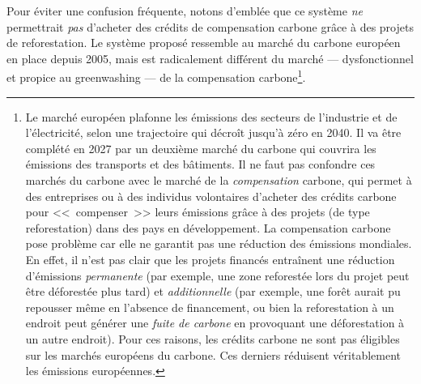 \documentclass[a5paper,french,openany]{memoir}
\begin{document}
Pour éviter une confusion fréquente, notons d'emblée que ce système \textit{ne} permettrait \textit{pas} d'acheter des crédits de compensation carbone grâce à des projets de reforestation. Le système proposé ressemble au marché du carbone européen en place depuis 2005, mais est radicalement différent du marché --- dysfonctionnel et propice au greenwashing --- de la compensation carbone\footnote{Le marché européen plafonne les émissions des secteurs de l'industrie et de l'électricité, selon une trajectoire qui décroît jusqu'à zéro en 2040. Il va être complété en 2027 par un deuxième marché du carbone qui couvrira les émissions des transports et des bâtiments. Il ne faut pas confondre ces marchés du carbone avec le marché de la \textit{compensation} carbone, qui permet à des entreprises ou à des individus volontaires d'acheter des crédits carbone pour <<~compenser~>> leurs émissions grâce à des projets (de type reforestation) dans des pays en développement. La compensation carbone pose problème car elle ne garantit pas une réduction des émissions mondiales. En effet, il n'est pas clair que les projets financés entraînent une réduction d'émissions \textit{permanente} (par exemple, une zone reforestée lors du projet peut être déforestée plus tard) et \textit{additionnelle} (par exemple, une forêt aurait pu repousser même en l'absence de financement, ou bien la reforestation à un endroit peut générer une \textit{fuite de carbone} en provoquant une déforestation à un autre endroit). Pour ces raisons, les crédits carbone ne sont pas éligibles sur les marchés européens du carbone. Ces derniers réduisent véritablement les émissions européennes.}.
\end{document}
